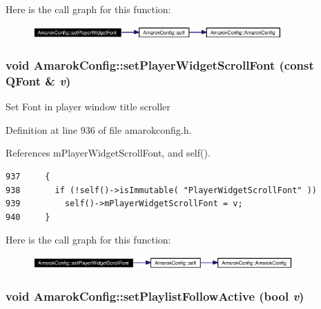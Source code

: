 Here is the call graph for this function:\begin{figure}[H]
\begin{center}
\leavevmode
\includegraphics[width=270pt]{classAmarokConfig_AmarokConfige95_cgraph}
\end{center}
\end{figure}
\subsubsection{\setlength{\rightskip}{0pt plus 5cm}void Amarok\-Config::set\-Player\-Widget\-Scroll\-Font (const QFont \& {\em v})\hspace{0.3cm}{\tt  [inline, static]}}\label{classAmarokConfig_AmarokConfige97}


Set Font in player window title scroller 

Definition at line 936 of file amarokconfig.h.

References m\-Player\-Widget\-Scroll\-Font, and self().



\footnotesize\begin{verbatim}937     {
938       if (!self()->isImmutable( "PlayerWidgetScrollFont" ))
939         self()->mPlayerWidgetScrollFont = v;
940     }
\end{verbatim}\normalsize 


Here is the call graph for this function:\begin{figure}[H]
\begin{center}
\leavevmode
\includegraphics[width=282pt]{classAmarokConfig_AmarokConfige97_cgraph}
\end{center}
\end{figure}
\subsubsection{\setlength{\rightskip}{0pt plus 5cm}void Amarok\-Config::set\-Playlist\-Follow\-Active (bool {\em v})\hspace{0.3cm}{\tt  [inline, static]}}\label{classAmarokConfig_AmarokConfige47}


